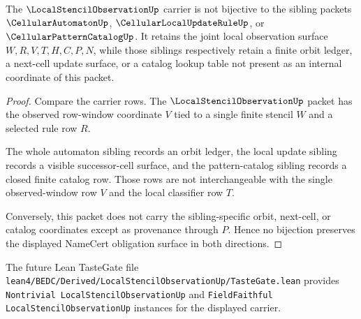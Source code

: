 \begin{theorem}
\label{thm:local-stencil-observation-sibling-independence}
The $\LocalStencilObservationUp$ carrier is not bijective to the sibling packets $\CellularAutomatonUp$, $\CellularLocalUpdateRuleUp$, or $\CellularPatternCatalogUp$. It retains the joint local observation surface $W,R,V,T,H,C,P,N$, while those siblings respectively retain a finite orbit ledger, a next-cell update surface, or a catalog lookup table not present as an internal coordinate of this packet.
\end{theorem}
\begin{proof}
Compare the carrier rows. The $\LocalStencilObservationUp$ packet has the observed row-window coordinate $V$ tied to a single finite stencil $W$ and a selected rule row $R$.

The whole automaton sibling records an orbit ledger, the local update sibling records a visible successor-cell surface, and the pattern-catalog sibling records a closed finite catalog row. Those rows are not interchangeable with the single observed-window row $V$ and the local classifier row $T$.

Conversely, this packet does not carry the sibling-specific orbit, next-cell, or catalog coordinates except as provenance through $P$. Hence no bijection preserves the displayed NameCert obligation surface in both directions.
\end{proof}

The future Lean TasteGate file \texttt{lean4/BEDC/Derived/LocalStencilObservationUp/TasteGate.lean} provides \texttt{Nontrivial LocalStencilObservationUp} and \texttt{FieldFaithful LocalStencilObservationUp} instances for the displayed carrier.


\begin{closurestatus}{\LocalStencilObservationUp}
  \theoryclosure{\obligationClosure}
  \formalstatus{\unformalizedV}
\end{closurestatus}
